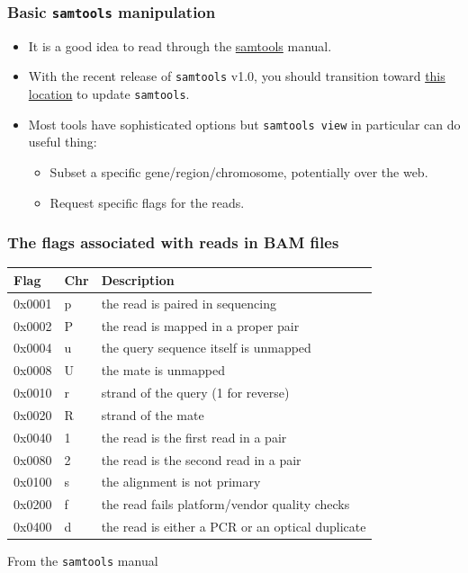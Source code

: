 \documentclass{beamer}
\begin{document}
\begin{frame}
  \frametitle{Basic \texttt{samtools} manipulation}
  \begin{itemize}
  \item It is a good idea to read through the \href{http://samtools.sourceforge.net/samtools.shtml}{samtools} manual.
  \item With the recent release of \texttt{samtools} v1.0, you should transition toward \href{http://www.htslib.org/}{this location} to update \texttt{samtools}.
  \item Most tools have sophisticated options but \texttt{samtools view} in particular can do useful thing:
    \begin{itemize}
    \item Subset a specific gene/region/chromosome, potentially over the web.
    \item Request specific flags for the reads.
    \end{itemize}
  \end{itemize}
\end{frame}


\begin{frame}
  \frametitle{The flags associated with reads in BAM files}
  \begin{tabular}{lll}
    Flag &       Chr &    Description\\
    \hline
    0x0001   &   p  &     the read is paired in sequencing\\
    0x0002   &   P  &     the read is mapped in a proper pair\\
    0x0004   &   u  &     the query sequence itself is unmapped\\
    0x0008   &   U  &     the mate is unmapped\\
    0x0010   &   r  &     strand of the query (1 for reverse)\\
    0x0020   &   R  &     strand of the mate\\
    0x0040   &   1  &     the read is the first read in a pair\\
    0x0080   &   2  &     the read is the second read in a pair\\
    0x0100   &   s  &     the alignment is not primary\\
    0x0200   &   f  &     the read fails platform/vendor quality checks\\
    0x0400   &   d  &     the read is either a PCR or an optical duplicate
  \end{tabular}
  {\tiny From the \texttt{samtools} manual}
\end{frame}
\end{document}
